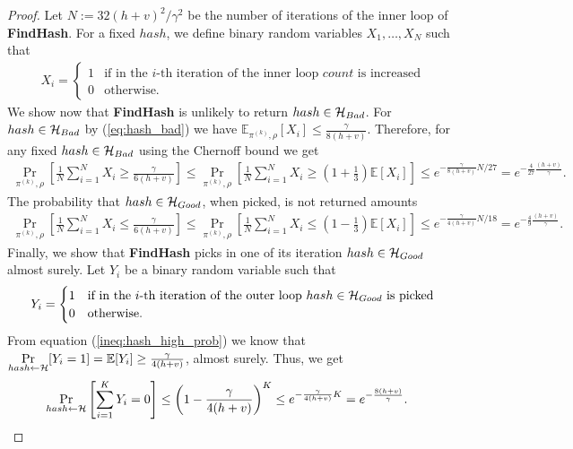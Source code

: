 \begin{proof}
Let $N := 32(h+v)^2/\gamma^2$ be the number of iterations of the inner loop of \textbf{FindHash}.
For a fixed $hash$, we define binary random variables $X_1, \dots, X_{N}$ such that
\begin{align*}
  X_i =
  \begin{cases}
    1 & \text{if in the $i$-th iteration of the inner loop $count$ is increased}\\
    0 & \text{otherwise.}
  \end{cases}
\end{align*}
We show now that \textbf{FindHash} is unlikely to return $hash \in \mathcal{H}_{Bad}$.
For $hash \in \mathcal{H}_{Bad}$ by (\ref{eq:hash_bad}) we have $\mathbb{E}_{\pi^{(k)},\rho}[X_i] \leq \frac{\gamma}{8(h+v)}$.
Therefore, for any fixed $hash \in \mathcal{H}_{Bad}$ using the Chernoff bound we get
\begin{align*}
  \underset{\pi^{(k)},\rho}{\Pr} \left[\frac{1}{N} \sum_{i=1}^{N} X_i \geq \frac{\gamma}{6(h+v)} \right] \leq
  \underset{\pi^{(k)}, \rho}{\Pr}\left[\frac{1}{N} \sum_{i=1}^{N} X_i \geq (1 + \frac{1}{3}) \mathbb{E}[X_i]\right] \leq
  e^{-{\frac{\gamma}{8(h+v)}} N /27} = e^{-\frac{4}{27}\frac{(h+v)}{\gamma}}.
\end{align*}
%
The probability that $hash \in \mathcal{H}_{Good}$, when picked, is not returned amounts
\begin{align*}
  \underset{\pi^{(k)}, \rho}{\Pr}\left[\frac{1}{N} \sum_{i=1}^{N} X_i \leq \frac{\gamma}{6(h+v)}\right] \leq
  \underset{\pi^{(k)}, \rho}{\Pr}\left[\frac{1}{N} \sum_{i=1}^{N} X_i \leq (1 - \frac{1}{3})\mathbb{E}[X_i]\right]
  \leq e^{-{\frac{\gamma}{4(h+v)}} N / 18} = e^{-\frac{4}{9} \frac{(h+v)}{\gamma}}.
\end{align*}
%
Finally, we show that \textbf{FindHash} picks in one of its iteration $hash \in \mathcal{H}_{Good}$ almost surely.
Let $Y_i$ be a binary random variable such that
\begin{align*}
  Y_i =
  \begin{cases}
    1 & \text{if in the $i$-th iteration of the outer loop $hash \in \mathcal{H}_{Good}$ is picked} \\
    0 & \text{otherwise.}
  \end{cases}
\end{align*}
From equation (\ref{ineq:hash_high_prob}) we know that $\underset{hash \leftarrow \mathcal{H}}{\Pr}[Y_i = 1] = \mathbb{E}[Y_i] \geq \frac{\gamma}{4(h+v)}$, almost surely.
Thus, we get
\begin{align*}
  \underset{hash \leftarrow \mathcal{H}}{\Pr}\left[\sum_{i=1}^{K} Y_i = 0\right] &\leq \left(1 - \frac{\gamma}{4(h+v)}\right)^{K} \leq e^{-\frac{\gamma}{4(h+v)} K}
  = e^{-\frac{8(h+v)}{\gamma}}.
\end{align*}
\end{proof}
